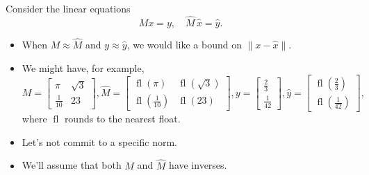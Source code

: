 \documentclass[usenames,dvipsnames,fleqn]{beamer}
\DeclareMathOperator{\fl}{fl}
\theoremstyle{definition}
\begin{document}
\begin{frame}
Consider the linear equations
\[
   M x = y, \quad \widehat M  \, \widehat x = \widehat y.
\]

\begin{itemize}

\item When $M \approx \widehat M$ and $y \approx \widehat y$, we would like a bound on $\| x - \widehat x \|$.

\item We might have, for example,
\[
   M = \begin{bmatrix} \pi & \sqrt{3} \\ \frac{1}{10} & 23 \end{bmatrix},  
   \widehat M =   \begin{bmatrix} \fl(\pi) & \fl(\sqrt{3}) \\ \fl(\frac{1}{10}) & \fl(23) \end{bmatrix},
   y = \begin{bmatrix} \frac{2}{3} \\ \frac{1}{42} \end{bmatrix}, 
   \widehat y = \begin{bmatrix} \fl(\frac{2}{3}) \\ \fl(\frac{1}{42}) \end{bmatrix},
   \]
where \(\fl\) rounds to the nearest float.

\item Let's not commit to a specific norm.

\item We'll assume that both \(M\) and \(\widehat M \) have inverses.
\end{itemize}

\end{frame}
\end{document}
